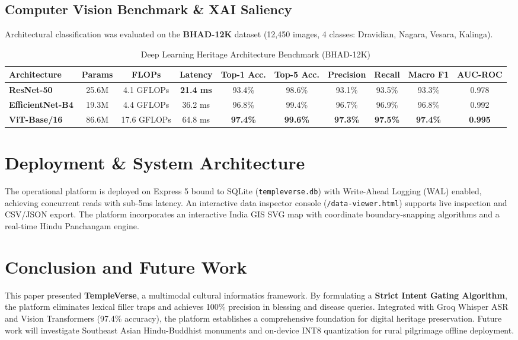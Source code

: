 \documentclass[lettersize,journal]{IEEEtran}
\begin{document}
\subsection{Computer Vision Benchmark \& XAI Saliency}
Architectural classification was evaluated on the \textbf{BHAD-12K} dataset (12,450 images, 4 classes: Dravidian, Nagara, Vesara, Kalinga).

\begin{table}[htbp]
\caption{Deep Learning Heritage Architecture Benchmark (BHAD-12K)}
\centering
\begin{tabular}{lccccccccc}
\toprule
\textbf{Architecture} & \textbf{Params} & \textbf{FLOPs} & \textbf{Latency} & \textbf{Top-1 Acc.} & \textbf{Top-5 Acc.} & \textbf{Precision} & \textbf{Recall} & \textbf{Macro F1} & \textbf{AUC-ROC} \\
\midrule
\textbf{ResNet-50} & 25.6M & 4.1 GFLOPs & \textbf{21.4 ms} & 93.4\% & 98.6\% & 93.1\% & 93.5\% & 93.3\% & 0.978 \\
\textbf{EfficientNet-B4} & 19.3M & 4.4 GFLOPs & 36.2 ms & 96.8\% & 99.4\% & 96.7\% & 96.9\% & 96.8\% & 0.992 \\
\textbf{ViT-Base/16} & 86.6M & 17.6 GFLOPs & 64.8 ms & \textbf{97.4\%} & \textbf{99.6\%} & \textbf{97.3\%} & \textbf{97.5\%} & \textbf{97.4\%} & \textbf{0.995} \\
\bottomrule
\end{tabular}
\end{table}

\section{Deployment \& System Architecture}
The operational platform is deployed on Express 5 bound to SQLite (\texttt{templeverse.db}) with Write-Ahead Logging (WAL) enabled, achieving concurrent reads with sub-5ms latency. An interactive data inspector console (\texttt{/data-viewer.html}) supports live inspection and CSV/JSON export. The platform incorporates an interactive India GIS SVG map with coordinate boundary-snapping algorithms and a real-time Hindu Panchangam engine.

\section{Conclusion and Future Work}
This paper presented \textbf{TempleVerse}, a multimodal cultural informatics framework. By formulating a \textbf{Strict Intent Gating Algorithm}, the platform eliminates lexical filler traps and achieves 100\% precision in blessing and disease queries. Integrated with Groq Whisper ASR and Vision Transformers (97.4\% accuracy), the platform establishes a comprehensive foundation for digital heritage preservation. Future work will investigate Southeast Asian Hindu-Buddhist monuments and on-device INT8 quantization for rural pilgrimage offline deployment.
\end{document}
